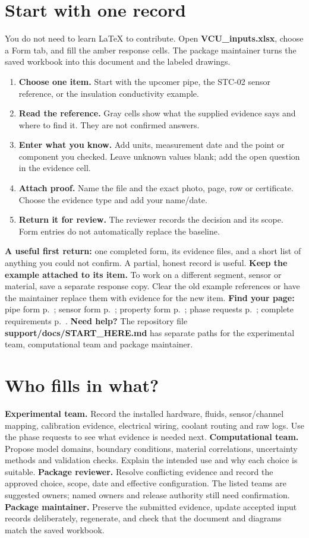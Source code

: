 \documentclass[11pt]{article}
\begin{document}
\section*{Start with one record}
You do not need to learn LaTeX to contribute. Open \textbf{VCU\_inputs.xlsx}, choose a Form tab, and fill the amber response cells. The package maintainer turns the saved workbook into this document and the labeled drawings.
\begin{enumerate}
\item \textbf{Choose one item.} Start with the upcomer pipe, the STC-02 sensor reference, or the insulation conductivity example.
\item \textbf{Read the reference.} Gray cells show what the supplied evidence says and where to find it. They are not confirmed answers.
\item \textbf{Enter what you know.} Add units, measurement date and the point or component you checked. Leave unknown values blank; add the open question in the evidence cell.
\item \textbf{Attach proof.} Name the file and the exact photo, page, row or certificate. Choose the evidence type and add your name/date.
\item \textbf{Return it for review.} The reviewer records the decision and its scope. Form entries do not automatically replace the baseline.
\end{enumerate}
\textbf{A useful first return:} one completed form, its evidence files, and a short list of anything you could not confirm. A partial, honest record is useful.
\textbf{Keep the example attached to its item.} To work on a different segment, sensor or material, save a separate response copy. Clear the old example references or have the maintainer replace them with evidence for the new item.
\textbf{Find your page:} pipe form p.~\pageref{form-pipe}; sensor form p.~\pageref{form-sensor}; property form p.~\pageref{form-material}; phase requests p.~\pageref{phase-requests}; complete requirements p.~\pageref{requirements}.
\textbf{Need help?} The repository file \textbf{support/docs/START\_HERE.md} has separate paths for the experimental team, computational team and package maintainer.
\clearpage\section{Who fills in what?}
\textbf{Experimental team.} Record the installed hardware, fluids, sensor/channel mapping, calibration evidence, electrical wiring, coolant routing and raw logs. Use the phase requests to see what evidence is needed next.
\textbf{Computational team.} Propose model domains, boundary conditions, material correlations, uncertainty methods and validation checks. Explain the intended use and why each choice is suitable.
\textbf{Package reviewer.} Resolve conflicting evidence and record the approved choice, scope, date and effective configuration. The listed teams are suggested owners; named owners and release authority still need confirmation.
\textbf{Package maintainer.} Preserve the submitted evidence, update accepted input records deliberately, regenerate, and check that the document and diagrams match the saved workbook.
\end{document}
